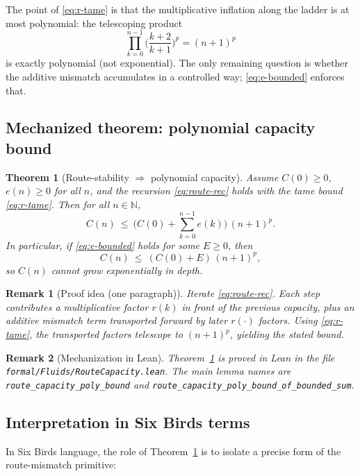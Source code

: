 \documentclass[11pt]{article}
\newcommand{\N}{\mathbb{N}}
\newtheorem{theorem}{Theorem}
\newtheorem{remark}{Remark}
\begin{document}
The point of \eqref{eq:r-tame} is that the multiplicative inflation along the ladder is at most
polynomial: the telescoping product
\[
\prod_{k=0}^{n-1}\Big(\frac{k+2}{k+1}\Big)^p = (n+1)^p
\]
is exactly polynomial (not exponential). The only remaining question is whether the additive mismatch
accumulates in a controlled way; \eqref{eq:e-bounded} enforces that.

\subsection{Mechanized theorem: polynomial capacity bound}

\begin{theorem}[Route-stability $\Rightarrow$ polynomial capacity]\label{thm:route-capacity}
Assume $C(0)\ge 0$, $e(n)\ge 0$ for all $n$, and the recursion \eqref{eq:route-rec} holds with
the tame bound \eqref{eq:r-tame}. Then for all $n\in\N$,
\[
C(n)\ \le\ \Big(C(0)+\sum_{k=0}^{n-1} e(k)\Big)\,(n+1)^p.
\]
In particular, if \eqref{eq:e-bounded} holds for some $E\ge 0$, then
\[
C(n)\ \le\ (C(0)+E)\,(n+1)^p,
\]
so $C(n)$ cannot grow exponentially in depth.
\end{theorem}

\begin{remark}[Proof idea (one paragraph)]
Iterate \eqref{eq:route-rec}. Each step contributes a multiplicative factor $r(k)$ in front of the
previous capacity, plus an additive mismatch term transported forward by later $r(\cdot)$ factors.
Using \eqref{eq:r-tame}, the transported factors telescope to $(n+1)^p$, yielding the stated bound.
\end{remark}

\begin{remark}[Mechanization in Lean]
Theorem~\ref{thm:route-capacity} is proved in Lean in the file
\nolinkurl{formal/Fluids/RouteCapacity.lean}.
The main lemma names are
\nolinkurl{route_capacity_poly_bound} and
\nolinkurl{route_capacity_poly_bound_of_bounded_sum}.
\end{remark}

\subsection{Interpretation in Six Birds terms}

In Six Birds language, the role of Theorem~\ref{thm:route-capacity} is to isolate a precise
form of the route-mismatch primitive:
\end{document}
